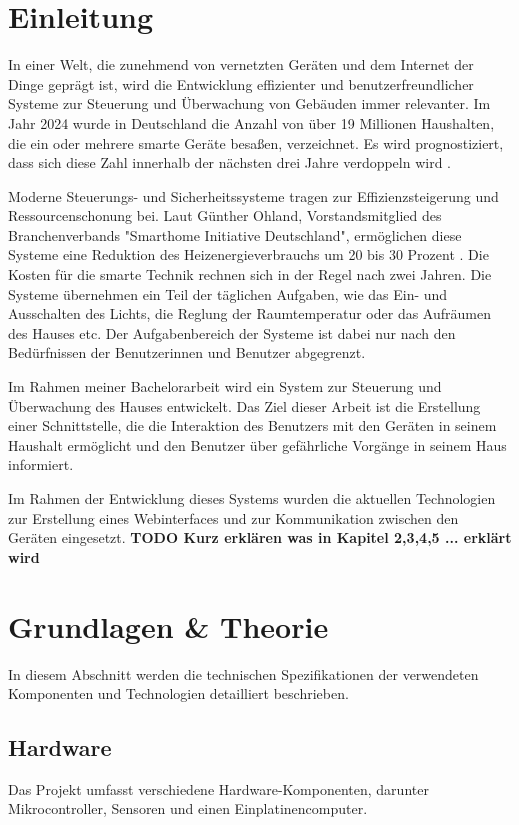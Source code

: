 \documentclass[12pt, letterpaper]{article}
\author{Oleksii Baida}
\date{Mai 2024}
\begin{document}


\tableofcontents
\pagebreak

\section{Einleitung}
\par In einer Welt, die zunehmend von vernetzten Geräten und dem Internet der Dinge geprägt ist, wird die Entwicklung effizienter und benutzerfreundlicher Systeme zur Steuerung und Überwachung von Gebäuden immer relevanter. Im Jahr 2024 wurde in Deutschland die Anzahl von über 19 Millionen Haushalten, die ein oder mehrere smarte Geräte besaßen, verzeichnet. Es wird prognostiziert, dass sich diese Zahl innerhalb der nächsten drei Jahre verdoppeln wird \cite{statita_smhomes}.
\par Moderne Steuerungs- und Sicherheitssysteme tragen zur Effizienzsteigerung und Ressourcenschonung bei. Laut Günther Ohland, Vorstandsmitglied des Branchenverbands "Smarthome Initiative Deutschland", ermöglichen diese Systeme eine Reduktion des Heizenergieverbrauchs um 20 bis 30 Prozent \cite{spiegel_heizung}. Die Kosten für die smarte Technik rechnen sich in der Regel nach zwei Jahren. Die Systeme übernehmen ein Teil der täglichen Aufgaben, wie das Ein- und Ausschalten des Lichts, die Reglung der Raumtemperatur oder das Aufräumen des Hauses etc. Der Aufgabenbereich der Systeme ist dabei nur nach den Bedürfnissen der Benutzerinnen und Benutzer abgegrenzt.
\par Im Rahmen meiner Bachelorarbeit wird ein System zur Steuerung und Überwachung des Hauses entwickelt. Das Ziel dieser Arbeit ist die Erstellung einer Schnittstelle, die die Interaktion des Benutzers mit den Geräten in seinem Haushalt ermöglicht und den Benutzer über gefährliche Vorgänge in seinem Haus informiert. 
\par Im Rahmen der Entwicklung dieses Systems wurden die aktuellen Technologien zur Erstellung eines Webinterfaces und zur Kommunikation zwischen den Geräten eingesetzt. \textbf{TODO Kurz erklären was in Kapitel 2,3,4,5 ... erklärt wird}

\newpage
\section{Grundlagen \& Theorie}
\par In diesem Abschnitt werden die technischen Spezifikationen der verwendeten Komponenten und Technologien detailliert beschrieben.
  \subsection{Hardware}
  \par Das Projekt umfasst verschiedene Hardware-Komponenten, darunter Mikrocontroller, Sensoren und einen Einplatinencomputer.
\end{document}
